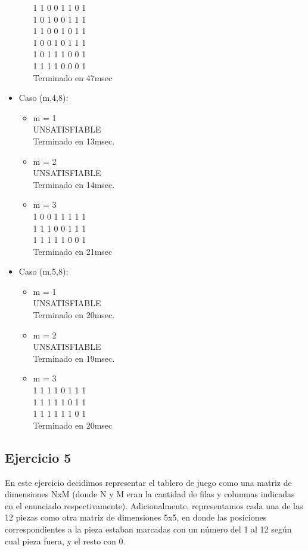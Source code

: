 \documentclass{article}
\begin{document}
\begin{itemize}
\begin{itemize}
1 1 0 0 1 1 0 1 \\
1 0 1 0 0 1 1 1 \\
1 1 0 0 1 0 1 1 \\
1 0 0 1 0 1 1 1 \\
1 0 1 1 1 0 0 1 \\
1 1 1 1 0 0 0 1 \\
Terminado en 47msec
\end{itemize}
\item Caso (m,4,8):
\begin{itemize}
\item m = 1\\
UNSATISFIABLE\\
Terminado en 13msec.

\item m = 2\\
UNSATISFIABLE\\
Terminado en 14msec.

\item m = 3\\
1 0 0 1 1 1 1 1 \\
1 1 1 0 0 1 1 1 \\
1 1 1 1 1 0 0 1 \\
Terminado en 21msec

\end{itemize}

\item Caso (m,5,8):
\begin{itemize}
\item m = 1\\
UNSATISFIABLE\\
Terminado en 20msec.
\item m = 2\\
UNSATISFIABLE\\
Terminado en 19msec.
\item m = 3\\
1 1 1 1 0 1 1 1 \\
1 1 1 1 1 0 1 1 \\
1 1 1 1 1 1 0 1 \\
Terminado en 20msec
\end{itemize}

\end{itemize}


\subsection{Ejercicio 5}


En este ejercicio decidimos representar el tablero de juego como una matriz de dimensiones NxM (donde N y M eran la cantidad de filas y columnas indicadas en el enunciado respectivamente). Adicionalmente, representamos cada una de las 12 piezas como otra matriz de dimensiones 5x5, en donde las posiciones correspondientes a la pieza estaban marcadas con un número del 1 al 12 según cual pieza fuera, y el resto con 0. \par
\end{document}
